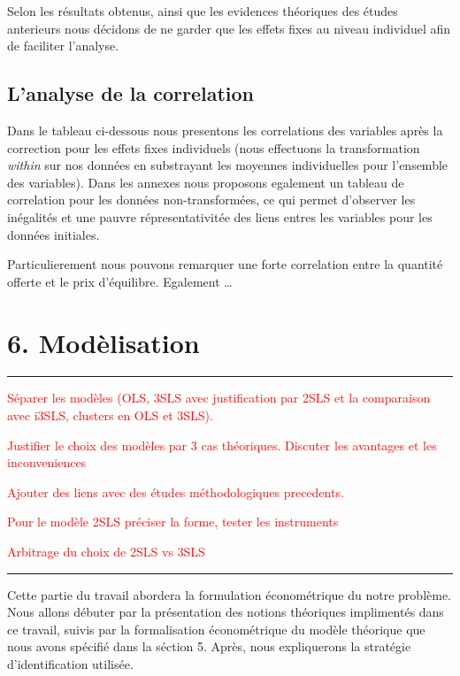 \documentclass[11pt,]{article}
\begin{document}
\FloatBarrier

Selon les résultats obtenus, ainsi que les evidences théoriques des
études anterieurs nous décidons de ne garder que les effets fixes au
niveau individuel afin de faciliter l'analyse.

\hypertarget{lanalyse-de-la-correlation}{%
\subsection{L'analyse de la
correlation}\label{lanalyse-de-la-correlation}}

Dans le tableau ci-dessous nous presentons les correlations des
variables après la correction pour les effets fixes individuels (nous
effectuons la transformation \emph{within} sur nos données en
substrayant les moyennes individuelles pour l'ensemble des variables).
Dans les annexes nous proposons egalement un tableau de correlation pour
les données non-transformées, ce qui permet d'observer les inégalités et
une pauvre répresentativitée des liens entres les variables pour les
données initiales.

Particulierement nous pouvons remarquer une forte correlation entre la
quantité offerte et le prix d'équilibre. Egalement \ldots{}

\hypertarget{modelisation}{%
\section{6. Modèlisation}\label{modelisation}}

\noindent

\rule[0.5ex]{\linewidth}{1pt}

\textcolor{red}{Séparer les modèles (OLS, 3SLS avec justification par 2SLS et la comparaison avec i3SLS, clusters en OLS et 3SLS).}

\textcolor{red}{Justifier le choix des modèles par 3 cas théoriques. Discuter les avantages et les inconveniences}

\textcolor{red}{Ajouter des liens avec des études méthodologiques precedents.}

\textcolor{red}{Pour le modèle 2SLS préciser la forme, tester les instruments}

\textcolor{red}{Arbitrage du choix de 2SLS vs 3SLS}

\noindent

\rule[0.5ex]{\linewidth}{1pt}

Cette partie du travail abordera la formulation économétrique du notre
problème. Nous allons débuter par la présentation des notions théoriques
implimentés dans ce travail, suivis par la formalisation économétrique
du modèle théorique que nous avons spécifié dans la séction 5. Après,
nous expliquerons la stratégie d'identification utilisée.
\end{document}
